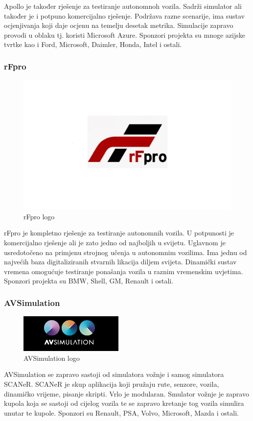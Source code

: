 Apollo je također rješenje za testiranje autonomnoh vozila. Sadrži simulator ali također je i potpuno komercijalno rješenje. Podržava razne scenarije, ima sustav ocjenjivanja koji daje ocjenu na temelju desetak metrika. Simulacije zapravo provodi u oblaku tj. koristi Microsoft Azure. Sponzori projekta su mnoge azijske tvrtke kao i Ford, Microsoft, Daimler, Honda, Intel i ostali.

\subsubsection{rFpro}
\begin{figure}[ht!]
  \centering
  \includegraphics[scale=0.2]{images/rfpro_logo.jpg}
  \caption{rFpro logo\cite{logo:rfpro}}
\end{figure}

rFpro je kompletno rješenje za testiranje autonomnih vozila. U potpunosti je komercijalno rješenje ali je zato jedno od najboljih u svijetu. Uglavnom je usredotočeno na primjenu strojnog učenja u autonomnim vozilima. Ima jednu od najvećih baza digitaliziranih stvarnih likacija diljem svijeta. Dinamički sustav vremena omogućuje testiranje ponašanja vozila u raznim vremenskim uvjetima. Sponzori projekta su BMW, Shell, GM, Renault i ostali.
\pagebreak
\subsubsection{AVSimulation}
\begin{figure}[ht!]
  \centering
  \includegraphics{images/avsimulation_logo.png}
  \caption{AVSimulation logo\cite{logo:avsimulation}}
\end{figure}

AVSimulation se zapravo sastoji od simulatora vožnje i samog simulatora SCANeR. SCANeR je skup aplikacija koji pružaju rute, senzore, vozila, dinamičko vrijeme, pisanje skripti. Vrlo je modularan. Smulator vožnje je zapravo kupola koja se sastoji od cijelog vozila te se zapravo kretanje tog vozila simulira unutar te kupole. Sponzori su Renault, PSA, Volvo, Microsoft, Mazda i ostali.
\newpage